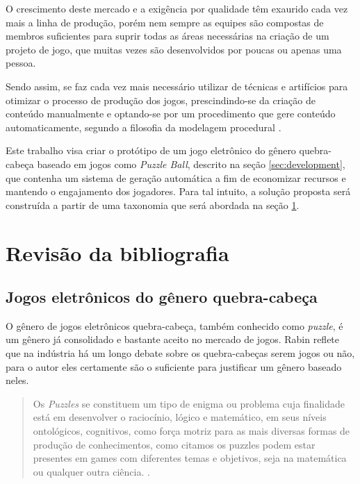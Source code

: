 \documentclass[10pt, conference, compsocconf]{IEEEtran}
\begin{document}
O crescimento deste mercado e a exigência por qualidade têm exaurido cada vez mais a linha de produção, porém nem sempre as equipes são compostas de membros suficientes para suprir todas as áreas necessárias na criação de um projeto de jogo, que muitas vezes são desenvolvidos por poucas ou apenas uma pessoa.

Sendo assim, se faz cada vez mais necessário utilizar de técnicas e artifícios para otimizar o processo de produção dos jogos, prescindindo-se da criação de conteúdo manualmente e optando-se por um procedimento que gere conteúdo automaticamente, segundo a filosofia da modelagem procedural \parencite{smelik2009survey}.

Este trabalho visa criar o protótipo de um jogo eletrônico do gênero quebra-cabeça baseado em jogos como \textit{Puzzle Ball}, descrito na seção \ref{sec:development}, que contenha um sistema de geração automática a fim de economizar recursos e mantendo o engajamento dos jogadores. Para tal intuito, a solução proposta será construída a partir de uma taxonomia que será abordada na seção \ref{sec:literature-review}.

\section{Revisão da bibliografia}
\label{sec:literature-review}

\subsection{Jogos eletrônicos do gênero quebra-cabeça}

O gênero de jogos eletrônicos quebra-cabeça, também conhecido como \textit{puzzle}, é um gênero já consolidado e bastante aceito no mercado de jogos. Rabin \parencite{rabin2011intro1} reflete que na indústria há um longo debate sobre os quebra-cabeças serem jogos ou não, para o autor eles certamente são o suficiente para justificar um gênero baseado neles.

\begin{quote}
    Os \textit{Puzzles} se constituem um tipo de enigma ou problema cuja finalidade está em desenvolver o raciocínio, lógico e matemático, em seus níveis ontológicos, cognitivos, como força motriz para as mais diversas formas de produção de conhecimentos, como citamos os puzzles podem estar presentes em games com diferentes temas e objetivos, seja na matemática ou qualquer outra ciência. \parencite{toneis2016puzzles}.
\end{quote}
\end{document}
